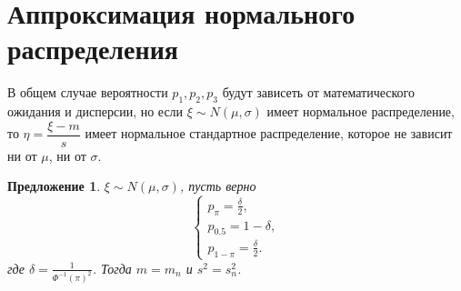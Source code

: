 \documentclass[12pt]{article}
\newtheorem{proposition}[theorem]{Предложение}
\begin{document}
	\section{Аппроксимация нормального распределения}
	В общем случае вероятности $p_{1}, p_{2}, p_{3}$ будут зависеть от математического ожидания и дисперсии, но если $\xi\sim N(\mu, \sigma) $ имеет нормальное распределение, то
	$\eta = \dfrac{\xi-m}{s}$ имеет нормальное стандартное распределение, которое не зависит ни от $\mu$, ни от $\sigma$.
	
	\begin{proposition}\label{pr7}
		$\xi\sim N(\mu, \sigma)$, пусть верно 
		\begin{equation}
			\begin{cases}
				p_{\pi} = \displaystyle{\frac{\delta}{2}},\\ 
				p_{0.5}=1-\delta , \\ 
				p_{1-\pi}=\displaystyle{\frac{\delta}{2}}.
			\end{cases}\label{7}
		\end{equation}
		где $\delta  = \displaystyle{\frac{1}{\Phi ^{-1}(\pi)^{2}}}$. Тогда $m=m_{n}$ и $s^{2} = s_{n}^{2}$.
	\end{proposition}
\end{document}
